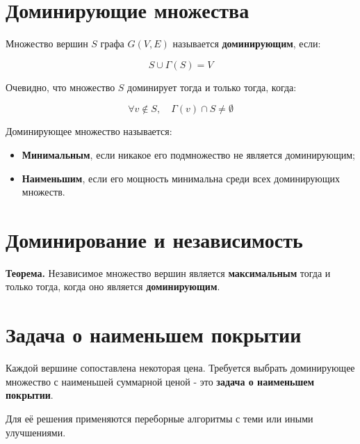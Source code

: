 {\section*{Доминирующие множества}

Множество вершин $S$ графа $G(V, E)$ называется \textbf{доминирующим}, если:


\[
S \cup \Gamma(S) = V
\]


Очевидно, что множество $S$ доминирует тогда и только тогда, когда:


\[
\forall v \notin S,\quad \Gamma(v) \cap S \neq \emptyset
\]



Доминирующее множество называется:
\begin{itemize}
  \item \textbf{Минимальным}, если никакое его подмножество не является доминирующим;
  \item \textbf{Наименьшим}, если его мощность минимальна среди всех доминирующих множеств.
\end{itemize}

\section*{Доминирование и независимость}

\textbf{Теорема.} Независимое множество вершин является \textbf{максимальным} тогда и только тогда, когда оно является \textbf{доминирующим}.

\section*{Задача о наименьшем покрытии}

Каждой вершине сопоставлена некоторая цена.  
Требуется выбрать доминирующее множество с наименьшей суммарной ценой - это \textbf{задача о наименьшем покрытии}.

Для её решения применяются переборные алгоритмы с теми или иными улучшениями.



    \newpage
}
